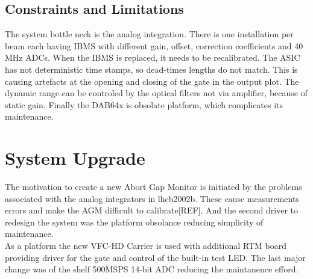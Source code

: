 \subsection{Constraints and Limitations}
The system bottle neck is the analog integration. There is one installation per
beam each having IBMS with different gain, offset, correction coefficients and
40 MHz ADCs. When the IBMS is replaced, it needs to be recalibrated. The ASIC
has not deterministic time stamps, so dead-times lengths do not match. This is
causing artefacts at the opening and closing of the gate in the output plot.
The dynamic range can be controled by the optical filters not via amplifier,
because of static gain. Finally the DAB64x is obsolate platform, which
complicates its maintenance.   

\section{System Upgrade}
The motivation to create a new Abort Gap Monitor is initiated by the problems
associated with the analog integrators in lhcb2002b. These cause measurements
errors and make the AGM difficult to calibrate[REF]. And the second driver to
redesign the system was the platform obsolance reducing simplicity of
maintenance. \\ 
As a platform the new VFC-HD Carrier is used with additional RTM board
providing driver for the gate and control of the built-in test LED. The last
major change was of the shelf 500MSPS 14-bit ADC reducing the maintanence
efford. 

